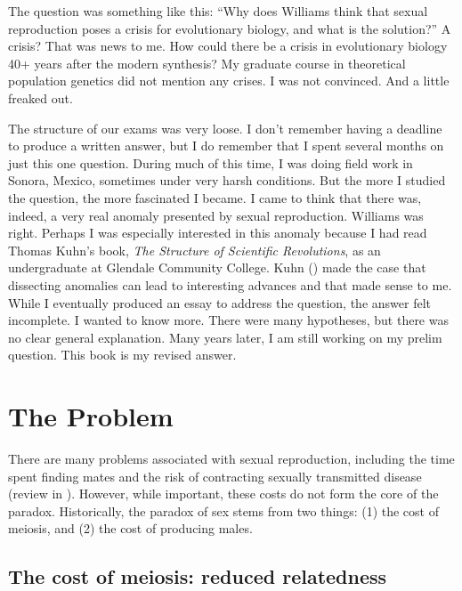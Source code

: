\documentclass[
  letterpaper,
]{book}
\begin{document}
The question was something like this: ``Why does Williams think that
sexual reproduction poses a crisis for evolutionary biology, and what is
the solution?'' A crisis? That was news to me. How could there be a
crisis in evolutionary biology 40+ years after the modern synthesis? My
graduate course in theoretical population genetics did not mention any
crises. I was not convinced. And a little freaked out.

The structure of our exams was very loose. I don't remember having a
deadline to produce a written answer, but I do remember that I spent
several months on just this one question. During much of this time, I
was doing field work in Sonora, Mexico, sometimes under very harsh
conditions. But the more I studied the question, the more fascinated I
became. I came to think that there was, indeed, a very real anomaly
presented by sexual reproduction. Williams was right. Perhaps I was
especially interested in this anomaly because I had read Thomas Kuhn's
book, \emph{The Structure of Scientific Revolutions}, as an
undergraduate at Glendale Community College. Kuhn
() made the case that dissecting anomalies
can lead to interesting advances and that made sense to me. While I
eventually produced an essay to address the question, the answer felt
incomplete. I wanted to know more. There were many hypotheses, but there
was no clear general explanation. Many years later, I am still working
on my prelim question. This book is my revised answer.

\section{The Problem}\label{the-problem}

There are many problems associated with sexual reproduction, including
the time spent finding mates and the risk of contracting sexually
transmitted disease (review in ). However, while important, these costs do not form
the core of the paradox. Historically, the paradox of sex stems from two
things: (1) the cost of meiosis, and (2) the cost of producing males.

\subsection{The cost of meiosis: reduced
relatedness}\label{the-cost-of-meiosis-reduced-relatedness}
\end{document}
